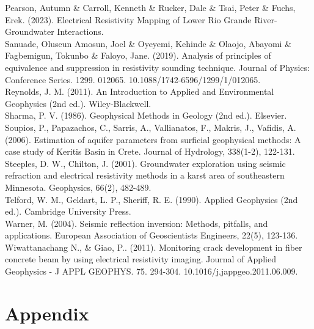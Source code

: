 \documentclass[12pt,a4paper]{report}
\begin{document}
\begin{justify}
    Pearson, Autumn \& Carroll, Kenneth \& Rucker, Dale \& Tsai, Peter \& Fuchs, Erek. (2023). Electrical Resistivity Mapping of Lower Rio Grande River-Groundwater Interactions. \\

    Sanuade, Oluseun Amosun, Joel \& Oyeyemi, Kehinde \& Olaojo, Abayomi \& Fagbemigun, Tokunbo \& Faloyo, Jane. (2019). Analysis of principles of equivalence and suppression in resistivity sounding technique. Journal of Physics: Conference Series. 1299. 012065. 10.1088/1742-6596/1299/1/012065. \\

    Reynolds, J. M. (2011). An Introduction to Applied and Environmental Geophysics (2nd ed.). Wiley-Blackwell. \\
    
    Sharma, P. V. (1986). Geophysical Methods in Geology (2nd ed.). Elsevier. \\
    
    Soupios, P., Papazachos, C., Sarris, A., Vallianatos, F., Makris, J., Vafidis, A. (2006). Estimation of aquifer parameters from surficial geophysical methods: A case study of Keritis Basin in Crete. Journal of Hydrology, 338(1-2), 122-131. \\
    
    Steeples, D. W., Chilton, J. (2001). Groundwater exploration using seismic refraction and electrical resistivity methods in a karst area of southeastern Minnesota. Geophysics, 66(2), 482-489. \\
    
    Telford, W. M., Geldart, L. P., Sheriff, R. E. (1990). Applied Geophysics (2nd ed.). Cambridge University Press. \\
    
    Warner, M. (2004). Seismic reflection inversion: Methods, pitfalls, and applications. European Association of Geoscientists Engineers, 22(5), 123-136. \\

    Wiwattanachang N., \& Giao, P.. (2011). Monitoring crack development in fiber concrete beam by using electrical resistivity imaging. Journal of Applied Geophysics - J APPL GEOPHYS. 75. 294-304. 10.1016/j.jappgeo.2011.06.009. \\
\end{justify}

\chapter*{Appendix}
\end{document}
